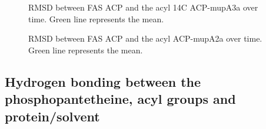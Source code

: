 \begin{singlespacing}
		\setlength\fboxsep{5pt}
		\setlength\fboxrule{1.5pt}
		\begin{figure}[htbp]
		\centering
		\caption[RMSD between FAS ACP and the acyl 14C ACP-mupA3a over time.]{RMSD between FAS ACP and the acyl 14C ACP-mupA3a over time. Green line represents the mean.}
		\label{fig:RmsdACPSPD}
		\end{figure}

		\setlength\fboxsep{5pt}
		\setlength\fboxrule{1.5pt}
		\begin{figure}[htbp]
		\centering
		\caption[RMSD between FAS ACP and the acyl ACP-mupA2a over time.]{RMSD between FAS ACP and the acyl ACP-mupA2a over time. Green line represents the mean.}
		\label{fig:RmsdACP2}
		\end{figure}

\newpage
	\subsection{Hydrogen bonding between the phosphopantetheine, acyl groups and protein/solvent}
	\label{sec:AppIII:hb}


\end{singlespacing}
